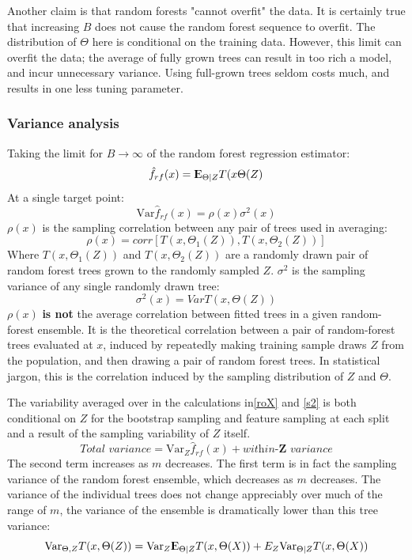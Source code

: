\documentclass[12pt, letterpaper]{article}
\theoremstyle{definition}
\newcommand{\E}{{\rm I\kern-.3em E}}
\newcommand{\Var}{\mathrm{Var}}
\begin{document}
Another claim is that random forests "cannot overfit" the data. It is certainly true that increasing $B$ does not cause the random forest sequence to overfit. The distribution of $\Theta$ here is conditional on the training data. However, this limit can overfit the data; the average of fully grown trees can result in too rich a model, and incur unnecessary variance. Using full-grown trees seldom costs much, and results in one less tuning parameter.

\subsubsection{Variance analysis}
Taking the limit for $B\rightarrow \infty$ of the random forest regression estimator:
\begin{equation}
\hat{f}_{rf}(x) = \E_{\Theta|Z} T(x \Theta(Z)
\end{equation}
At a single target point:
\begin{equation}
\Var \hat{f}_{rf}(x)  =\rho(x) \sigma^2 (x)
\end{equation}
$\rho(x)$ is the sampling correlation between any pair of trees used in averaging:
\begin{equation}
\rho(x) = corr\left[ T(x,\Theta_1(Z)), T(x,\Theta_2(Z))\right]
\label{roX}
\end{equation}
Where $T(x,\Theta_1(Z))$ and $T(x,\Theta_2(Z))$ are a randomly drawn pair of random forest trees grown to the randomly sampled $Z$. $\sigma^2$ is the sampling variance of any single randomly drawn tree:
\begin{equation}
\sigma^2(x) = Var T(x, \Theta(Z))
\label{s2}
\end{equation}
$\rho(x)$ \textbf{is not} the average correlation between fitted trees in a given random-forest ensemble. It is the theoretical correlation between a pair of random-forest trees evaluated at $x$, induced by repeatedly making training sample draws $Z$ from the population, and then drawing a pair of random forest trees. In statistical jargon, this is the correlation induced by the sampling distribution of $Z$ and $\Theta$.

The variability averaged over in the calculations in\ref{roX} and \ref{s2} is both conditional on $Z$ for the bootstrap sampling and feature sampling at each split and a result of the sampling variability of $Z$ itself.
\begin{equation}
\textit{Total variance} = \Var_Z \hat{f}_{rf}(x) + \textit{within-$\mathbf{Z}$ variance}
\end{equation}
The second term increases as $m$ decreases. The first term is in fact the sampling variance of the random forest ensemble, which decreases as $m$ decreases. 
The variance of the individual trees does not change appreciably over much of the range of $m$, the variance of the ensemble is dramatically lower than this tree variance:
\begin{equation}
\Var_{\Theta,Z} T(x, \Theta(Z)) = \Var_Z \E_{\Theta|Z}T(x, \Theta(X)) + E_Z\Var_{\Theta|Z}T(x, \Theta(X))
\end{equation}
\end{document}
